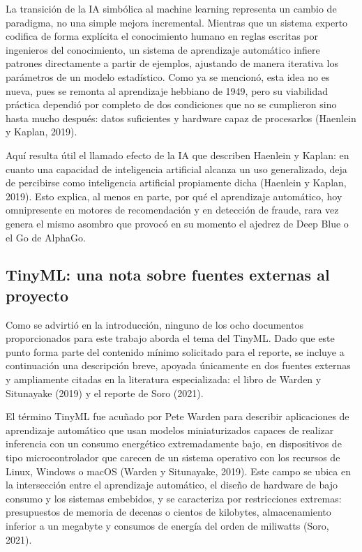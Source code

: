 \documentclass[12pt,letterpaper]{article}
\begin{document}
La transici\'on de la IA simb\'olica al machine learning representa un cambio de paradigma, no una simple mejora incremental. Mientras que un sistema experto codifica de forma expl\'icita el conocimiento humano en reglas escritas por ingenieros del conocimiento, un sistema de aprendizaje autom\'atico infiere patrones directamente a partir de ejemplos, ajustando de manera iterativa los par\'ametros de un modelo estad\'istico. Como ya se mencion\'o, esta idea no es nueva, pues se remonta al aprendizaje hebbiano de 1949, pero su viabilidad pr\'actica dependi\'o por completo de dos condiciones que no se cumplieron sino hasta mucho despu\'es: datos suficientes y hardware capaz de procesarlos (Haenlein y Kaplan, 2019).

Aqu\'i resulta \'util el llamado efecto de la IA que describen Haenlein y Kaplan: en cuanto una capacidad de inteligencia artificial alcanza un uso generalizado, deja de percibirse como inteligencia artificial propiamente dicha (Haenlein y Kaplan, 2019). Esto explica, al menos en parte, por qu\'e el aprendizaje autom\'atico, hoy omnipresente en motores de recomendaci\'on y en detecci\'on de fraude, rara vez genera el mismo asombro que provoc\'o en su momento el ajedrez de Deep Blue o el Go de AlphaGo.

\subsection{TinyML: una nota sobre fuentes externas al proyecto}

Como se advirti\'o en la introducci\'on, ninguno de los ocho documentos proporcionados para este trabajo aborda el tema del TinyML. Dado que este punto forma parte del contenido m\'inimo solicitado para el reporte, se incluye a continuaci\'on una descripci\'on breve, apoyada \'unicamente en dos fuentes externas y ampliamente citadas en la literatura especializada: el libro de Warden y Situnayake (2019) y el reporte de Soro (2021).

El t\'ermino TinyML fue acu\~nado por Pete Warden para describir aplicaciones de aprendizaje autom\'atico que usan modelos miniaturizados capaces de realizar inferencia con un consumo energ\'etico extremadamente bajo, en dispositivos de tipo microcontrolador que carecen de un sistema operativo con los recursos de Linux, Windows o macOS (Warden y Situnayake, 2019). Este campo se ubica en la intersecci\'on entre el aprendizaje autom\'atico, el dise\~no de hardware de bajo consumo y los sistemas embebidos, y se caracteriza por restricciones extremas: presupuestos de memoria de decenas o cientos de kilobytes, almacenamiento inferior a un megabyte y consumos de energ\'ia del orden de miliwatts (Soro, 2021).
\end{document}
